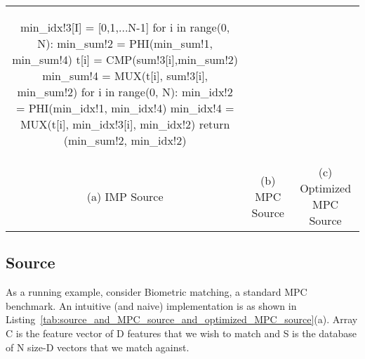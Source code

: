 \begin{table*}
\begin{tabular}{ccc}
\begin{minipage}{0.33\textwidth}
{\begin{pythonn}
min_idx!3[I] = [0,1,...N-1]
for i in range(0, N):
   min_sum!2 = PHI(min_sum!1, min_sum!4)
   t[i] = CMP(sum!3[i],min_sum!2)
   min_sum!4 = MUX(t[i], sum!3[i], min_sum!2)
for i in range(0, N):
   min_idx!2 = PHI(min_idx!1, min_idx!4)
   min_idx!4 = MUX(t[i], min_idx!3[i], min_idx!2)
return (min_sum!2, min_idx!2)
\end{pythonn}
}
\end{minipage}

\\

(a) IMP Source & (b) MPC Source & (c) Optimized MPC Source
\end{tabular}
\caption{Biometric Matching: ==== From (a) IMP Source to (b) MPC Source: 
First, MPC Source is an SSA form.
Second, it is linear. The conditional in lines 13-15 in IMP Source turns into the linear code in lines 12-16 in MPC Source.
The test turns into the CMP operation {\sf t = CMP(sum!3,min\_sum!2)}, followed by the
true-branch sequence, followed by the MUX operations. The first MUX operation selects the value
of {\sf min\_sum}: if {\sf t} is true, then {\sf min\_sum} gets the value of the second multiplexer
argument,  {\sf min\_sum!3}, otherwise it takes the value of the third argument, {\sf min\_sum!2}.
Third, MPC Source is a special form of SSA. The SSA $\phi$-nodes at the if-then-else (lines 13-15) turn into
MUX operations, while the $\phi$-nodes at for-loops turn into \emph{pseudo} PHI nodes with a straightforward semantics.
==== From (b) MPC Source to (c) Optimized MPC Source: 
The compiler determines that SUB and MUL in ``naive'' MPC Source (lines 9 and 10 in (b))
can be fully vectorized into the SIMD SUB and MUL in optimized MPC Source (lines 9 and 10 in (c)).
Notation {\sf p[I,J]} denotes a 2-dimensional array with fully vectorized dimensions.
The computation of sum (line 11 in (b))
is sequential across the $j$-dimension, but it is parallel across the $i$-dimension.
The loop in lines 12-16 in (c) illustrates; here {\sf p[I,j]} refers to the $j$-th column in {\sf p}.
Unfortunately, CMP and MUX remain sequential.
}
\label{tab:source_and_MPC_source_and_optimized_MPC_source}
\end{table*}


\subsection{Source}

As a running example, consider Biometric matching, a standard MPC benchmark.
An intuitive (and naive) implementation is as shown in Listing~\ref{tab:source_and_MPC_source_and_optimized_MPC_source}(a).
Array {\sf C} is the feature vector of {\sf D} features that we wish to match and {\sf S}
is the database of {\sf N} size-{\sf D} vectors that we match against.

